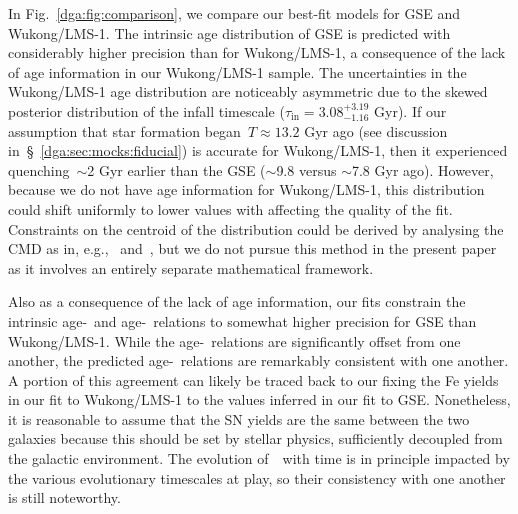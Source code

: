 \par
In Fig.~\ref{dga:fig:comparison}, we compare our best-fit models for GSE and
Wukong/LMS-1.
The intrinsic age distribution of GSE is predicted with considerably higher
precision than for Wukong/LMS-1, a consequence of the lack of age information
in our Wukong/LMS-1 sample.
The uncertainties in the Wukong/LMS-1 age distribution are noticeably
asymmetric due to the skewed posterior distribution of the infall timescale
($\tau_\text{in} = 3.08^{+3.19}_{-1.16}$ Gyr).
If our assumption that star formation began~$T \approx 13.2$ Gyr ago (see
discussion in~\S~\ref{dga:sec:mocks:fiducial}) is accurate for Wukong/LMS-1, then
it experienced quenching~$\sim$2 Gyr earlier than the GSE ($\sim$9.8 versus
$\sim$7.8 Gyr ago).
However, because we do not have age information for Wukong/LMS-1, this
distribution could shift uniformly to lower values with affecting the quality
of the fit.
Constraints on the centroid of the distribution could be derived by
analysing the CMD as in, e.g.,~\citet{Dolphin2002} and~\citet{Weisz2014b}, but
we do not pursue this method in the present paper as it involves an entirely
separate mathematical framework.
\par
Also as a consequence of the lack of age information, our fits constrain the
intrinsic age-\feh~and age-\afe~relations to somewhat higher precision for GSE
than Wukong/LMS-1.
While the age-\feh~relations are significantly offset from one another, the
predicted age-\afe~relations are remarkably consistent with one another.
A portion of this agreement can likely be traced back to our fixing the Fe
yields in our fit to Wukong/LMS-1 to the values inferred in our fit to GSE.
Nonetheless, it is reasonable to assume that the SN yields are the same between
the two galaxies because this should be set by stellar physics, sufficiently
decoupled from the galactic environment.
The evolution of~\afe~with time is in principle impacted by the various
evolutionary timescales at play, so their consistency with one another is still
noteworthy.

